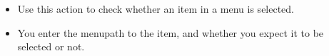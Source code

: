 \begin{itemize}
\item Use this action to check whether an item in a menu is selected.
\item You enter the menupath to the item, and whether you expect it to be selected or not.
\end{itemize}

